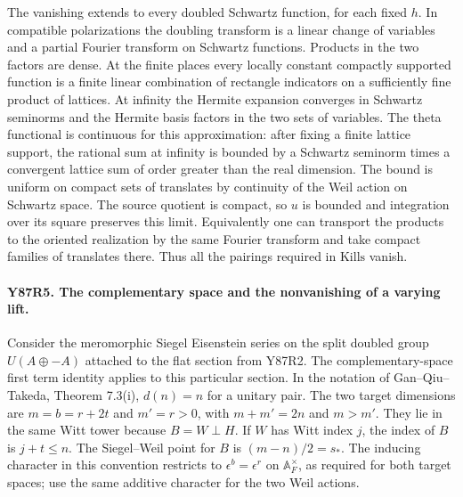 The vanishing extends to every doubled Schwartz function, for each
fixed $h$. In compatible polarizations the doubling transform is a
linear change of variables and a partial Fourier transform on
Schwartz functions. Products in the two factors are dense. At
the finite places every locally constant compactly supported
function is a finite linear combination of rectangle indicators
on a sufficiently fine product of lattices. At infinity the
Hermite expansion converges in Schwartz seminorms and the Hermite
basis factors in the two sets of variables. The theta functional
is continuous for this approximation: after fixing a finite
lattice support, the rational sum at infinity is bounded by a
Schwartz seminorm times a convergent lattice sum of order greater
than the real dimension. The bound is uniform on compact sets of
translates by continuity of the Weil action on Schwartz space.
The source quotient is compact, so $u$ is bounded and integration
over its square preserves this limit. Equivalently one can transport
the products to the oriented realization by the same Fourier
transform and take compact families of translates there. Thus all
the pairings required in $\mathrm{Kills}$ vanish.

\paragraph{Y87R5. The complementary space and the nonvanishing of a varying lift.}
Consider the meromorphic Siegel Eisenstein series on the split
doubled group $U(A\oplus -A)$ attached to the flat section from
Y87R2. The complementary-space first term identity applies to
this particular section. In the notation of Gan--Qiu--Takeda,
Theorem 7.3(i), $d(n)=n$ for a unitary pair. The two target
dimensions are $m=b=r+2t$ and $m'=r>0$, with
$m+m'=2n$ and $m>m'$. They lie in the same Witt tower because
$B=W\perp H$. If $W$ has Witt index $j$, the index of $B$ is
$j+t\le n$. The Siegel--Weil point for $B$ is $(m-n)/2=s_*$.
The inducing character in this convention restricts to
$\epsilon^b=\epsilon^r$ on $\mathbb A_F^\times$, as required for
both target spaces; use the same additive character for the two
Weil actions.

